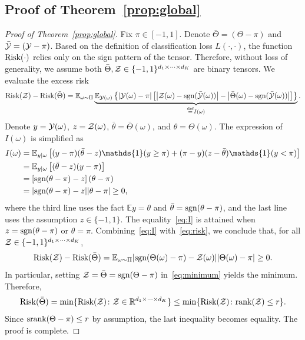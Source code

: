 \documentclass[twoside,11pt]{article}
\theoremstyle{definition}
\newcommand*{\KeepStyleUnderBrace}[1]{%
  \mathop{%
    \mathchoice
    {\underbrace{\displaystyle#1}}%
    {\underbrace{\textstyle#1}}%
    {\underbrace{\scriptstyle#1}}%
    {\underbrace{\scriptscriptstyle#1}}%
  }\limits
}
\def\sign{\textup{sgn}}
\def\srank{\textup{srank}}
\def\rank{\textup{rank}}
\def\risk{\textup{Risk}}
\begin{document}
\subsection{Proof of Theorem~\ref{prop:global}}
\begin{proof}[Proof of Theorem~\ref{prop:global}]
Fix $\pi\in[-1,1]$. Denote $\bar \Theta=(\Theta-\pi)$ and $\bar {\mathcal{Y}}=(\mathcal{Y}-\pi)$. Based on the definition of classification loss $L(\cdot,\cdot)$, the function $\risk(\cdot)$ relies only on the sign pattern of the tensor. Therefore, without loss of generality, we assume both $\bar \Theta, \mathcal{Z} \in\{-1,1\}^{d_1\times \cdots \times d_K}$ are binary tensors. 
We evaluate the excess risk 
\begin{equation}\label{eq:risk}
\risk(\tZ)- \risk(\bar \Theta) = \mathbb{E}_{\omega\sim \Pi}\KeepStyleUnderBrace{\mathbb{E}_{\tY(\omega)}\left\{|\tY(\omega)-\pi|\left[\left|\tZ(\omega)-\sign(\bar \tY(\omega)) \right|-\left|\bar\Theta(\omega)-\sign(\bar \tY(\omega))\right|\right]\right\}}_{\stackrel{\text{def}}{=}I(\omega)}.
\end{equation}
Denote $y=\mathcal{Y}(\omega)$, $z=\mathcal{Z}(\omega)$, $\bar \theta=\bar\Theta(\omega)$, and $\theta=\Theta(\omega)$. The expression of $I(\omega)$ is simplified as
\begin{align}\label{eq:I}
I(\omega)&= \mathbb{E}_{y|\omega}\left[ (y-\pi)(\bar \theta-z)\mathds{1}(y\geq \pi)+(\pi-y)(z-\bar \theta)\mathds{1}(y< \pi)\right]\notag \\
&= \mathbb{E}_{y|\omega}\left[(\bar \theta-z) (y-\pi)\right]\notag \\
&=  \left[\sign(\theta-\pi)-z\right]\left(\theta-\pi\right)\notag \\
&= |\sign(\theta-\pi)-z||\theta-\pi|\geq 0,
\end{align}
where the third line uses the fact $\mathbb{E}y=\theta$ and $\bar \theta=\sign(\theta-\pi)$, and the last line uses the assumption $z \in\{-1,1\}$. The equality~\eqref{eq:I} is attained when $z=\sign(\theta-\pi)$ or $\theta=\pi$. Combining~\eqref{eq:I} with~\eqref{eq:risk}, we conclude that, for all $\mathcal{Z}\in\{-1,1\}^{d_1\times \cdots \times d_K}$, 
\begin{equation}\label{eq:minimum}
\risk(\tZ)- \risk(\bar \Theta) = \mathbb{E}_{\omega\sim \Pi} |\sign(\Theta(\omega)-\pi)-\tZ(\omega)||\Theta(\omega)-\pi|\geq 0.
\end{equation}
In particular, setting $\tZ=\bar \Theta=\sign(\Theta-\pi)$ in~\eqref{eq:minimum} yields the minimum. Therefore, 
\[
\risk(\bar \Theta)=\min\{\risk(\tZ)\colon \tZ\in \mathbb{R}^{d_1\times \cdots \times d_K}\} \leq \min\{\risk(\tZ)\colon \rank(\tZ)\leq r\}.
\]
Since $\srank(\Theta-\pi)\leq r$ by assumption, the last inequality becomes equality. The proof is complete. 
\end{proof}
\end{document}
